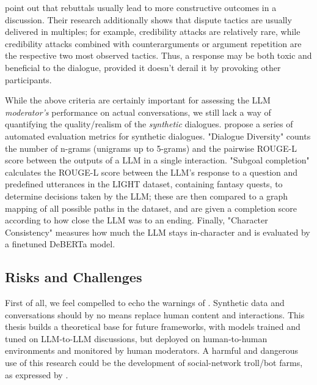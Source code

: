 \citet{dekock2022disagree} point out that rebuttals usually lead to more constructive outcomes in a discussion. Their research additionally shows that dispute tactics are usually delivered in multiples; for example, credibility attacks are relatively rare, while credibility attacks combined with counterarguments or argument repetition are the respective two most observed tactics. Thus, a response may be both toxic and beneficial to the dialogue, provided it doesn't derail it by provoking other participants.

While the above criteria are certainly important for assessing the LLM \textit{moderator's} performance on actual conversations, we still lack a way of quantifying the quality/realism of the \textit{synthetic} dialogues. \citet{ulmer2024bootstrappingllmbasedtaskorienteddialogue} propose a series of automated evaluation metrics for synthetic dialogues. "Dialogue Diversity" counts the number of n-grams (unigrams up to 5-grams) and the pairwise ROUGE-L \cite{lin-2004-rouge} score between the outputs of a LLM in a single interaction. "Subgoal completion" calculates the ROUGE-L score between the LLM's response to a question and predefined utterances in the LIGHT \cite{urbanek-etal-2019-learning} dataset, containing fantasy quests, to determine decisions taken by the LLM; these are then compared to a graph mapping of all possible paths in the dataset, and are given a completion score according to how close the LLM was to an ending. Finally, "Character Consistency" measures how much the LLM stays in-character and is evaluated by a finetuned DeBERTa \cite{he2023debertav3improvingdebertausing} model.



\subsection{Risks and Challenges}
\label{sec:related:challenges}

First of all, we feel compelled to echo the warnings of \citet{small-polis-llm}. Synthetic data and conversations should by no means replace human content and interactions. This thesis builds a theoretical base for future frameworks, with models trained and tuned on LLM-to-LLM discussions, but deployed on human-to-human environments and monitored by human moderators. A harmful and dangerous use of this research could be the development of social-network troll/bot farms, as expressed by \citet{park2022socialsimulacracreatingpopulated}.

